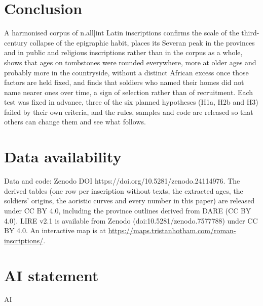 \section{Conclusion}\label{sec:conc}
A harmonised corpus of {{n.all|int}} Latin inscriptions confirms the scale of the third-century collapse of the epigraphic habit, places its Severan peak in the provinces and in public and religious inscriptions rather than in the corpus as a whole, shows that ages on tombstones were rounded everywhere, more at older ages and probably more in the countryside, without a distinct African excess once those factors are held fixed, and finds that soldiers who named their homes did not name nearer ones over time, a sign of selection rather than of recruitment. Each test was fixed in advance, three of the six planned hypotheses (H1a, H2b and H3) failed by their own criteria, and the rules, samples and code are released so that others can change them and see what follows.

\section*{Data availability}
Data and code: Zenodo DOI https://doi.org/10.5281/zenodo.24114976. The derived tables (one row per inscription without texts, the extracted ages, the soldiers' origins, the aoristic curves and every number in this paper) are released under CC BY 4.0, including the province outlines derived from DARE (CC BY 4.0). LIRE v2.1 is available from Zenodo (doi:10.5281/zenodo.7577788) under CC BY 4.0. An interactive map is at \url{https://maps.tristanhotham.com/roman-inscriptions/}.

\section*{AI statement}
{{AI}}

